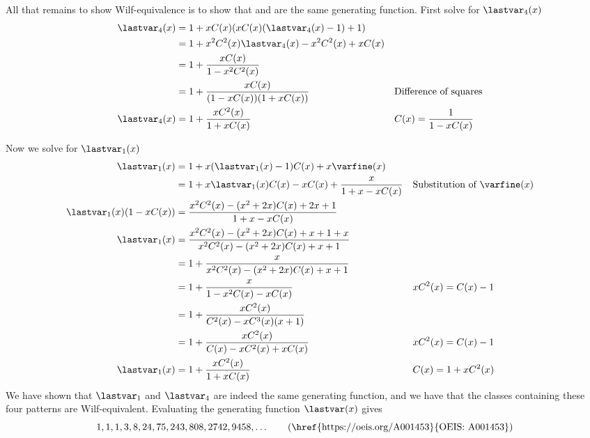 All that remains to show Wilf-equivalence is to show that  and
 are the same generating function.
First solve  for \(\lastvar_4(x)\)
\begin{equation}
    \begin{aligned}
        \lastvar_4(x) &= 1+xC(x)(xC(x)(\lastvar_4(x)-1)+1)\\
        &= 1 + x^2C^2(x)\lastvar_4(x) -x^2C^2(x) +xC(x)\\
        &= 1 + \frac{xC(x)}{1 - x^2C^2(x)}\\
        &= 1 + \frac{xC(x)}{(1-xC(x))(1+xC(x))} && \text{Difference of squares}\\
        \lastvar_4(x)&= 1 + \frac{xC^2(x)}{1+xC(x)} && C(x) = \frac{1}{1-xC(x)}
    \end{aligned}
\end{equation}

Now we solve  for \(\lastvar_1(x)\)
\begin{equation}
    \begin{aligned}
        \lastvar_1(x)&= 1+x(\lastvar_1(x)-1)C(x)+x\varfine(x)\\
        &= 1+x\lastvar_1(x)C(x)-xC(x)+\frac{x}{1+x-xC(x)} &&\text{Substitution of \(\varfine(x)\)}\\
        \lastvar_1(x)(1-xC(x))&= \frac{x^2C^2(x) - (x^2+2x)C(x) + 2x+1}{1+x-xC(x)}\\
        \lastvar_1(x) &= \frac{x^2C^2(x) - (x^2+2x)C(x) + x+1+x}{x^2C^2(x) - (x^2+2x)C(x) +x+1}\\
        &= 1 +\frac{x}{x^2C^2(x) - (x^2+2x)C(x) +x+1}\\
        &= 1 + \frac{x}{1-x^2C(x)-xC(x)} && xC^2(x) = C(x)-1\\
        &= 1 + \frac{xC^2(x)}{C^2(x) - xC^3(x)(x+1)}\\
        &= 1 + \frac{xC^2(x)}{C(x) - xC^2(x) + xC(x)} && xC^2(x) = C(x)-1\\
        \lastvar_1(x)&= 1 + \frac{xC^2(x)}{1+xC(x)} && C(x) = 1+xC^2(x)\\
    \end{aligned}
\end{equation}
We have shown that \(\lastvar_1\) and \(\lastvar_4\) are indeed the same generating function,
and we have that the classes containing these four patterns are Wilf-equivalent.
Evaluating the generating function \(\lastvar(x)\) gives
\begin{equation*}
    1, 1, 1, 3, 8, 24, 75, 243, 808, 2742, 9458,\dotsc \tag{\href{https://oeis.org/A001453}{OEIS: A001453}}
\end{equation*}

